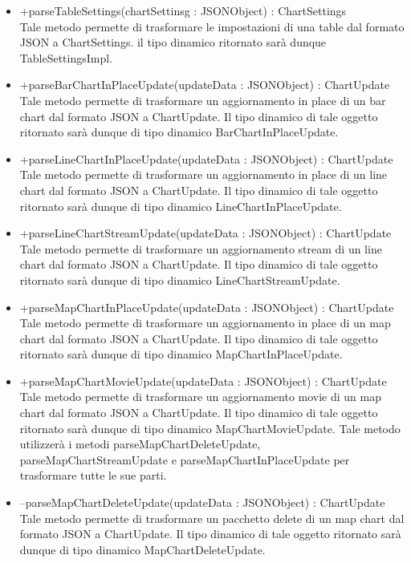 \begin{itemize}
\begin{itemize}
					\item[\ding{111}] {{+parseTableSettings(chartSettinsg : JSONObject) : ChartSettings}} \\ [1mm] Tale metodo permette di trasformare le impostazioni di una table dal formato JSON a ChartSettings. il tipo dinamico ritornato sarà dunque TableSettingsImpl.
					\item[\ding{111}] {{+parseBarChartInPlaceUpdate(updateData : JSONObject) : ChartUpdate}} \\ [1mm] Tale metodo permette di trasformare un aggiornamento in place di un bar chart dal formato JSON a ChartUpdate. Il tipo dinamico di tale oggetto ritornato sarà dunque di tipo dinamico BarChartInPlaceUpdate.
					\item[\ding{111}] {{+parseLineChartInPlaceUpdate(updateData : JSONObject) : ChartUpdate}} \\ [1mm] Tale metodo permette di trasformare un aggiornamento in place di un line chart dal formato JSON a ChartUpdate. Il tipo dinamico di tale oggetto ritornato sarà dunque di tipo dinamico LineChartInPlaceUpdate.
					\item[\ding{111}] {{+parseLineChartStreamUpdate(updateData : JSONObject) : ChartUpdate}} \\ [1mm] Tale metodo permette di trasformare un aggiornamento stream di un line chart dal formato JSON a ChartUpdate. Il tipo dinamico di tale oggetto ritornato sarà dunque di tipo dinamico LineChartStreamUpdate.
					\item[\ding{111}] {{+parseMapChartInPlaceUpdate(updateData : JSONObject) : ChartUpdate}} \\ [1mm] Tale metodo permette di trasformare un aggiornamento in place di un map chart dal formato JSON a ChartUpdate. Il tipo dinamico di tale oggetto ritornato sarà dunque di tipo dinamico MapChartInPlaceUpdate.
					\item[\ding{111}] {{+parseMapChartMovieUpdate(updateData : JSONObject) : ChartUpdate}} \\ [1mm] Tale metodo permette di trasformare un aggiornamento movie di un map chart dal formato JSON a ChartUpdate. Il tipo dinamico di tale oggetto ritornato sarà dunque di tipo dinamico MapChartMovieUpdate.
Tale metodo utilizzerà i metodi parseMapChartDeleteUpdate, parseMapChartStreamUpdate e parseMapChartInPlaceUpdate per trasformare tutte le sue parti.
					\item[\ding{111}] {{--parseMapChartDeleteUpdate(updateData : JSONObject) : ChartUpdate}} \\ [1mm] Tale metodo permette di trasformare un pacchetto delete di un map chart dal formato JSON a ChartUpdate. Il tipo dinamico di tale oggetto ritornato sarà dunque di tipo dinamico MapChartDeleteUpdate.

\end{itemize}
\end{itemize}
